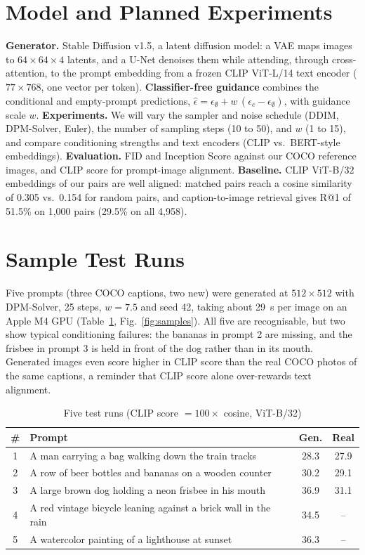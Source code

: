\documentclass[conference]{IEEEtran}
\begin{document}
\section{Model and Planned Experiments}
\textbf{Generator.} Stable Diffusion v1.5, a latent diffusion model: a VAE maps images to $64\times64\times4$
latents, and a U-Net denoises them while attending, through cross-attention, to the prompt embedding from a frozen
CLIP ViT-L/14 text encoder ($77\times768$, one vector per token). \textbf{Classifier-free guidance} combines the
conditional and empty-prompt predictions,
$\hat\epsilon=\epsilon_\emptyset+w\,(\epsilon_c-\epsilon_\emptyset)$, with guidance scale $w$.
\textbf{Experiments.} We will vary the sampler and noise schedule (DDIM, DPM-Solver, Euler), the number of sampling
steps (10 to 50), and $w$ (1 to 15), and compare conditioning strengths and text encoders (CLIP vs.\ BERT-style
embeddings). \textbf{Evaluation.} FID and Inception Score against our COCO reference images, and CLIP score for
prompt-image alignment. \textbf{Baseline.} CLIP ViT-B/32 embeddings of our pairs are well aligned: matched pairs
reach a cosine similarity of 0.305 vs.\ 0.154 for random pairs, and caption-to-image retrieval gives R@1 of 51.5\% on
1,000 pairs (29.5\% on all 4,958).

\section{Sample Test Runs}
Five prompts (three COCO captions, two new) were generated at $512\times512$ with DPM-Solver, 25 steps, $w=7.5$ and
seed 42, taking about 29~s per image on an Apple M4 GPU (Table~\ref{tab:runs}, Fig.~\ref{fig:samples}). All five are
recognisable, but two show typical conditioning failures: the bananas in prompt 2 are missing, and the frisbee in
prompt 3 is held in front of the dog rather than in its mouth. Generated images even score higher in CLIP score than
the real COCO photos of the same captions, a reminder that CLIP score alone over-rewards text alignment.

\begin{table}[t]
\caption{Five test runs (CLIP score $=100\times$ cosine, ViT-B/32)}
\label{tab:runs}
\centering\footnotesize
\begin{tabular}{@{}c p{} c c@{}}
\toprule
\# & Prompt & Gen. & Real \\
\midrule
1 & A man carrying a bag walking down the train tracks & 28.3 & 27.9 \\
2 & A row of beer bottles and bananas on a wooden counter & 30.2 & 29.1 \\
3 & A large brown dog holding a neon frisbee in his mouth & 36.9 & 31.1 \\
4 & A red vintage bicycle leaning against a brick wall in the rain & 34.5 & -- \\
5 & A watercolor painting of a lighthouse at sunset & 36.3 & -- \\
\bottomrule
\end{tabular}
\end{table}
\end{document}
